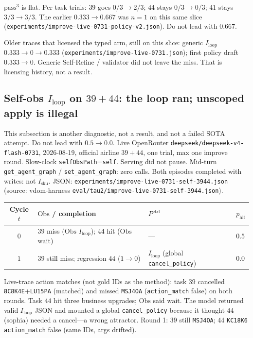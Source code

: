 \documentclass{article}
\begin{document}
\(\mathrm{pass}^3\) is flat. Per-task trials: \(39\) goes \(0/3\to 2/3\); \(44\) stays \(0/3\to 0/3\); \(41\) stays \(3/3\to 3/3\). The earlier \(0.333\to 0.667\) was \(n=1\) on this same slice (\texttt{experiments/improve-live-0731-policy-v2.json}). Do not lead with \(0.667\).

Older traces that licensed the typed arm, still on this slice: generic \(I_{\mathrm{loop}}\) \(0.333\to 0\to 0.333\) (\texttt{experiments/improve-live-0731.json}); first policy draft \(0.333\to 0\). Generic Self-Refine / validator did not leave the miss. That is licensing history, not a result.

\subsection{Self-obs \(I_{\mathrm{loop}}\) on \(39+44\): the loop ran; unscoped apply is illegal}
\label{sec:selfobs}

This subsection is another diagnostic, not a result, and not a failed SOTA attempt. Do not lead with \(0.5\to 0.0\). Live OpenRouter \texttt{deepseek/deepseek-v4-flash-0731}, 2026-08-19, official airline \(39+44\), one trial, max one improve round. Slow-clock \texttt{selfObsPath}=\texttt{self}. Serving did not pause. Mid-turn \texttt{get\_agent\_graph} / \texttt{set\_agent\_graph}: zero calls. Both episodes completed with writes: not \(I_{\mathrm{sku}}\). JSON: \texttt{experiments/improve-live-0731-self-3944.json} (source: vdom-harness \texttt{eval/tau2/improve-live-0731-self-3944.json}).

\begin{center}
\small
\begin{tabular}{clll}
\toprule
Cycle \(t\) & \(\mathrm{Obs}\) / completion & \(P^{\mathrm{ctrl}}\) & \(p_{\mathrm{hit}}\) \\
\midrule
\(0\) & \(39\) miss (\(\mathrm{Obs}\) \(I_{\mathrm{loop}}\)); \(44\) hit (\(\mathrm{Obs}\) \(\mathrm{wait}\)) & --- & \(0.5\) \\
\(1\) & \(39\) still miss; regression \(44\) (\(1\to 0\)) & \(I_{\mathrm{loop}}\) (global \texttt{cancel\_policy}) & \(0.0\) \\
\bottomrule
\end{tabular}
\end{center}

Live-trace action matches (not gold IDs as the method): task \(39\) cancelled \texttt{8C8K4E}+\texttt{LU15PA} (matched) and missed \texttt{MSJ4OA} (\texttt{action\_match} false) on both rounds. Task \(44\) hit three business upgrades; \(\mathrm{Obs}\) said \(\mathrm{wait}\). The model returned valid \(I_{\mathrm{loop}}\) JSON and mounted a global \texttt{cancel\_policy} because it thought \(44\) (sophia) needed a cancel---a wrong attractor. Round 1: \(39\) still \texttt{MSJ4OA}; \(44\) \texttt{KC18K6} \texttt{action\_match} false (same IDs, args drifted).
\end{document}
